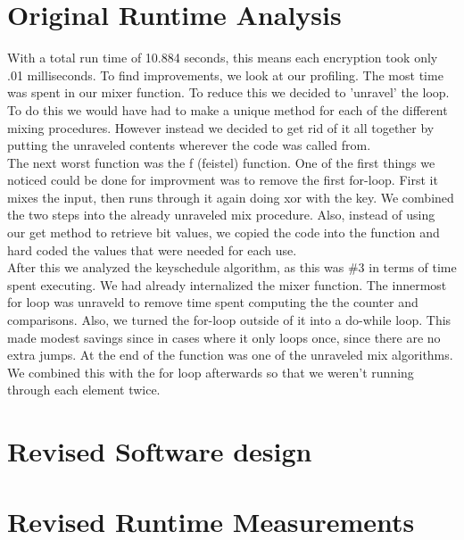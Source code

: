 \documentclass[10pt]{article}
\begin{document}
\section{Original Runtime Analysis}
\indent With a total run time of 10.884 seconds, this means each encryption took only .01 milliseconds.  To find improvements, we look at our profiling.  The most time was spent in our mixer function.  To reduce this we decided to 'unravel' the loop.  To do this we would have had to make a unique method for each of the different mixing procedures.  However instead we decided to get rid of it all together by putting the unraveled contents wherever the code was called from.
\\ \indent The next worst function was the f (feistel) function.  One of the first things we noticed could be done for improvment was to remove the first for-loop. First it mixes the input, then runs through it again doing xor with the key. We combined the two steps into the already unraveled mix procedure. Also, instead of using our get method to retrieve bit values, we copied the code into the function and hard coded the values that were needed for each use.
\\ \indent After this we analyzed the keyschedule algorithm, as this was \#3 in terms of time spent executing.  We had already internalized the mixer function.  The innermost for loop was unraveld to remove time spent computing the the counter and comparisons.  Also, we turned the for-loop outside of it into a do-while loop.  This made modest savings since in cases where it only loops once, since there are no extra jumps.  At the end of the function was one of the unraveled mix algorithms.  We combined this with the for loop afterwards so that we weren't running through each element twice.
\section{Revised Software design}
\section{Revised Runtime Measurements}
\end{document}
